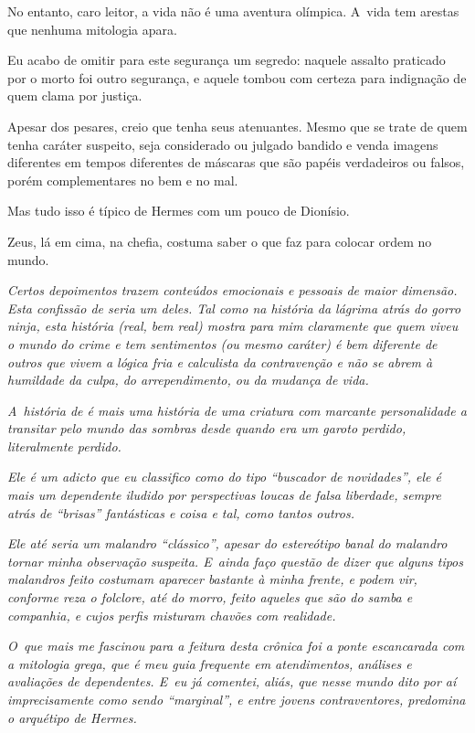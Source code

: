 \asterisc{}

No entanto, caro leitor, a vida não é uma aventura olímpica. A~vida tem
arestas que nenhuma mitologia apara.

Eu acabo de omitir para este segurança um segredo: naquele assalto
praticado por  o morto foi outro segurança, e aquele tombou com
certeza para indignação de quem clama por justiça.

Apesar dos pesares, creio que  tenha seus atenuantes. Mesmo que se
trate de quem tenha caráter suspeito, seja considerado ou julgado
bandido e venda imagens diferentes em tempos diferentes de máscaras que
são papéis verdadeiros ou falsos, porém complementares no bem e no mal.

Mas tudo isso é típico de Hermes com um pouco de Dionísio.

Zeus, lá em cima, na chefia, costuma saber o que faz para colocar ordem
no mundo.

\begin{center}\asterisc{}\end{center}


\emph{Certos depoimentos trazem conteúdos emocionais e pessoais de maior
dimensão. Esta confissão de  seria um deles. Tal como na história da
lágrima atrás do gorro ninja, esta história (real, bem real) mostra para
mim claramente que quem viveu o mundo do crime e tem sentimentos (ou
mesmo caráter) é bem diferente de outros que vivem a lógica fria e
calculista da contravenção e não se abrem à humildade da culpa, do
arrependimento, ou da mudança de vida.}~

\emph{A~história de  é mais uma história de uma criatura com marcante
personalidade a transitar pelo mundo das sombras desde quando era um
garoto perdido, literalmente perdido.}~

\emph{Ele é um adicto que eu classifico como do tipo ``buscador de
novidades'', ele é mais um dependente iludido por perspectivas loucas de
falsa liberdade, sempre atrás de ``brisas'' fantásticas e coisa e tal,
como tantos outros.}~

\emph{Ele até seria um malandro ``clássico'', apesar do estereótipo
banal do malandro tornar minha observação suspeita. E~ainda faço questão
de dizer que alguns tipos malandros feito  costumam aparecer bastante
à minha frente, e podem vir, conforme reza o folclore, até do morro,
feito aqueles que são do samba e companhia, e cujos perfis misturam
chavões com realidade.}~

\emph{O~que mais me fascinou para a feitura desta crônica foi a ponte
escancarada com a mitologia grega, que é meu guia frequente em
atendimentos, análises e avaliações de dependentes. E~eu já comentei,
aliás, que nesse mundo dito por aí imprecisamente como sendo
``marginal'', e entre jovens contraventores, predomina o arquétipo de
Hermes.}~

